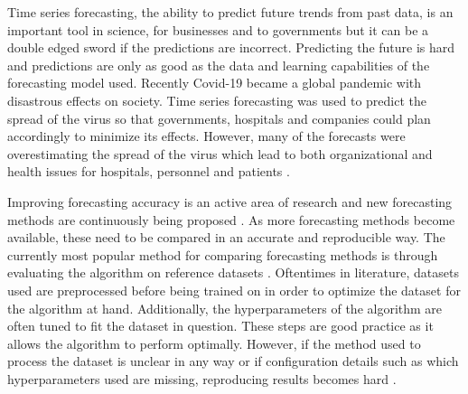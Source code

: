
\ifpdf
    \graphicspath{{1_introduction/figures/PNG/}{1_introduction/figures/PDF/}{1_introduction/figures/}}
\else
    \graphicspath{{1_introduction/figures/EPS/}{1_introduction/figures/}}
\fi



Time series forecasting, the ability to predict future trends from past data, is an important tool in science, for businesses and to governments but it can be a double edged sword if the predictions are incorrect. Predicting the future is hard and predictions are only as good as the data and learning capabilities of the forecasting model used. Recently Covid-19 became a global pandemic with disastrous effects on society. Time series forecasting was used to predict the spread of the virus so that governments, hospitals and companies could plan accordingly to minimize its effects. However, many of the forecasts were overestimating the spread of the virus which lead to both organizational and health issues for hospitals, personnel and patients \cite{IOANNIDIS2020}. 

Improving forecasting accuracy is an active area of research and new forecasting methods are continuously being proposed \cite{salinas_deepar_2019,rangapuram_deep_2018,oord_wavenet_2016,oreshkin_n-beats_2020,salinas_high-dimensional_2019}. As more forecasting methods become available, these need to be compared in an accurate and reproducible way. The currently most popular method for comparing forecasting methods is through evaluating the algorithm on reference datasets \cite{hyndman_forecasting_3rd}. Oftentimes in literature, datasets used are preprocessed before being trained on in order to optimize the dataset for the algorithm at hand. Additionally, the hyperparameters of the algorithm are often tuned to fit the dataset in question. These steps are good practice as it allows the algorithm to perform optimally. However, if the method used to process the dataset is unclear in any way or if configuration details such as which hyperparameters used are missing, reproducing results becomes hard \cite{makridakis_m4_2020}. 

